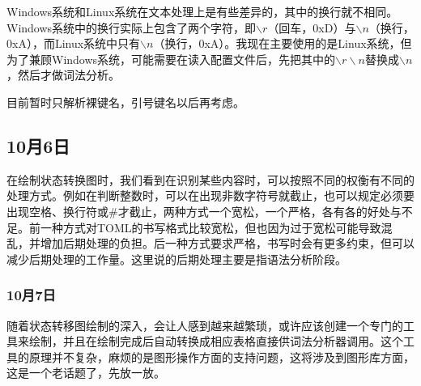 \documentclass[oneside,fontset=founder]{ctexbook}
\begin{document}
Windows系统和Linux系统在文本处理上是有些差异的，其中的换行就不相同。Windows系统中的换行实际上包含了两个字符，即$\backslash r$（回车，0xD）与$\backslash n$（换行，0xA），而Linux系统中只有$\backslash n$（换行，0xA）。我现在主要使用的是Linux系统，但为了兼顾Windows系统，可能需要在读入配置文件后，先把其中的$\backslash r\backslash n$替换成$\backslash n$，然后才做词法分析。

目前暂时只解析裸键名，引号键名以后再考虑。


\subsection{10月6日}
在绘制状态转换图时，我们看到在识别某些内容时，可以按照不同的权衡有不同的处理方式。例如在判断整数时，可以在出现非数字符号就截止，也可以规定必须要出现空格、换行符或\#才截止，两种方式一个宽松，一个严格，各有各的好处与不足。前一种方式对TOML的书写格式比较宽松，但也因为过于宽松可能导致混乱，并增加后期处理的负担。后一种方式要求严格，书写时会有更多约束，但可以减少后期处理的工作量。这里说的后期处理主要是指语法分析阶段。


\subsubsection{10月7日}
随着状态转移图绘制的深入，会让人感到越来越繁琐，或许应该创建一个专门的工具来绘制，并且在绘制完成后自动转换成相应表格直接供词法分析器调用。这个工具的原理并不复杂，麻烦的是图形操作方面的支持问题，这将涉及到图形库方面，这是一个老话题了，先放一放。
\end{document}
